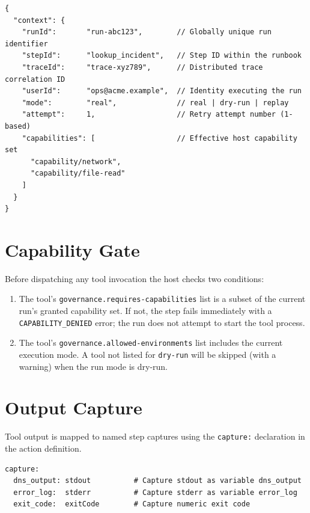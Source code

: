 \begin{verbatim}
{
  "context": {
    "runId":       "run-abc123",        // Globally unique run identifier
    "stepId":      "lookup_incident",   // Step ID within the runbook
    "traceId":     "trace-xyz789",      // Distributed trace correlation ID
    "userId":      "ops@acme.example",  // Identity executing the run
    "mode":        "real",              // real | dry-run | replay
    "attempt":     1,                   // Retry attempt number (1-based)
    "capabilities": [                   // Effective host capability set
      "capability/network",
      "capability/file-read"
    ]
  }
}
\end{verbatim}

\section{Capability Gate}
\label{sec:tool-capability-gate}

Before dispatching any tool invocation the host checks two conditions:

\begin{enumerate}
  \item The tool's \texttt{governance.requires-capabilities} list is a subset
        of the current run's granted capability set.  If not, the step fails
        immediately with a \texttt{CAPABILITY\_DENIED} error; the run does not
        attempt to start the tool process.
  \item The tool's \texttt{governance.allowed-environments} list includes the
        current execution mode.  A tool not listed for \texttt{dry-run} will be
        skipped (with a warning) when the run mode is dry-run.
\end{enumerate}

\section{Output Capture}
\label{sec:tool-output}

Tool output is mapped to named step captures using the \texttt{capture:}
declaration in the action definition.

\begin{verbatim}
capture:
  dns_output: stdout          # Capture stdout as variable dns_output
  error_log:  stderr          # Capture stderr as variable error_log
  exit_code:  exitCode        # Capture numeric exit code
\end{verbatim}

